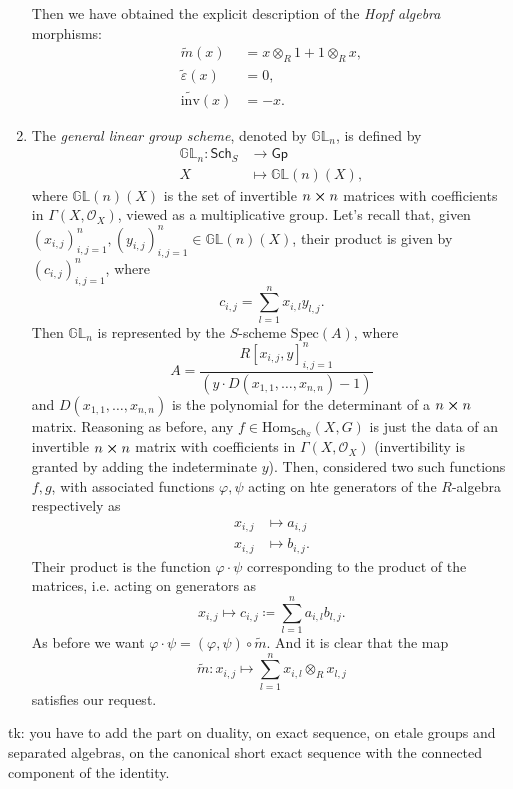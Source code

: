 \documentclass[../Main]{subfiles}
\begin{document}
\begin{ex}
\begin{enumerate}
			Then we have obtained the explicit description of the {\em Hopf algebra}
			morphisms:
			\begin{align}
				\widetilde{m}(x) &= x \otimes_R 1 + 1 \otimes_R x,\\
				\widetilde{\varepsilon}(x) &= 0, \nonumber\\
				\widetilde{\mathrm{inv}}(x) &= -x \nonumber
			.\end{align} 

		\item The {\em general linear group scheme}, denoted by $\mathbb{GL}_n$,
			is defined by
			\begin{align}
				\mathbb{GL}_n\colon \mathsf{Sch}_{ S } &\longrightarrow \mathsf{Gp} \\
				X &\longmapsto \mathbb{GL}(n)(X) \nonumber
			,\end{align} 
			where $\mathbb{GL}(n)(X)$ is the set of invertible $n \cross n$
			matrices with coefficients in $\Gamma \left( X , \mathcal{O}_{ X } \right)$,
			viewed as a multiplicative group.
			Let's recall that, given $\left( x_{i,j} \right)_{i,j = 1}^n, 
			\left( y_{i,j} \right)_{i,j = 1}^n \in \mathbb{GL}(n)(X)$,
			their product is given by $\left( c_{i,j} \right)_{i,j = 1}^n$,
			where
			\begin{equation}
			c_{i,j} = \sum_{l=1}^{n} x_{i,l} y_{l,j}
			.\end{equation} 
			Then $\mathbb{GL}_n$ is represented by the $S$-scheme
			$\mathrm{Spec}(A)$, where
			\begin{equation}
				A = \frac{R[x_{i,j},y]_{i,j = 1}^n}{(y \cdot D(x_{1,1}, \ldots, x_{n,n})-1)}
			\end{equation} 
			and $D(x_{1,1}, \ldots, x_{n,n})$ is the polynomial for the determinant
			of a $n \cross n$ matrix.
			Reasoning as before, any $f \in \mathrm{Hom}_{\mathsf{Sch}_S}
			\left( X, G \right)$ is just the data of an invertible $n \cross n$ matrix
			with coefficients in $\Gamma \left( X , \mathcal{O}_{ X } \right)$
			(invertibility is granted by adding the indeterminate $y$).
			Then, considered two such functions $f,g$, with associated functions
			$\varphi, \psi$ acting on hte generators of the $R$-algebra
			respectively as
			\begin{align}
				x_{i,j} &\longmapsto a_{i,j}\\
				x_{i,j} &\longmapsto b_{i,j}\nonumber
			.\end{align} 
			Their product is the function $\varphi \cdot \psi$
			corresponding to the product of the matrices, i.e. acting on generators as
			\begin{equation}
				x_{i,j} \longmapsto c_{i,j} \coloneqq 
				\sum_{l=1}^{n} a_{i,l} b_{l,j}
			.\end{equation} 
			As before we want $\varphi \cdot \psi = (\varphi, \psi) \circ \widetilde{m}$.
			And it is clear that the map
			\begin{equation}
				\widetilde{m}\colon x_{i,j} \longmapsto 
				\sum_{l=1}^{n} x_{i,l} \otimes_R x_{l,j}
			\end{equation} 
			satisfies our request.
	\end{enumerate}
\end{ex}

tk: you have to add the part on duality, on exact sequence, on etale groups and separated algebras,
on the canonical short exact sequence with the connected component of the identity.
\end{document}
